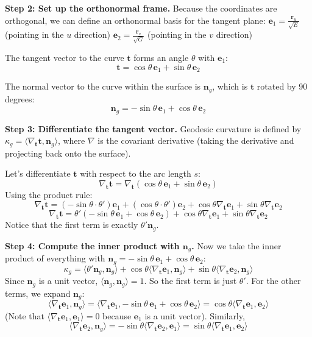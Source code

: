 \begin{solution}
\textbf{Step 2: Set up the orthonormal frame.}
Because the coordinates are orthogonal, we can define an orthonormal basis for the tangent plane:
$\mathbf{e}_1 = \frac{\mathbf{r}_u}{\sqrt{E}}$ (pointing in the $u$ direction)
$\mathbf{e}_2 = \frac{\mathbf{r}_v}{\sqrt{G}}$ (pointing in the $v$ direction)

The tangent vector to the curve $\mathbf{t}$ forms an angle $\theta$ with $\mathbf{e}_1$:
\[ \mathbf{t} = \cos\theta \, \mathbf{e}_1 + \sin\theta \, \mathbf{e}_2 \]

The normal vector to the curve within the surface is $\mathbf{n}_g$, which is $\mathbf{t}$ rotated by 90 degrees:
\[ \mathbf{n}_g = -\sin\theta \, \mathbf{e}_1 + \cos\theta \, \mathbf{e}_2 \]

\textbf{Step 3: Differentiate the tangent vector.}
Geodesic curvature is defined by $\kappa_g = \langle \nabla_\mathbf{t} \mathbf{t}, \mathbf{n}_g \rangle$, where $\nabla$ is the covariant derivative (taking the derivative and projecting back onto the surface).

Let's differentiate $\mathbf{t}$ with respect to the arc length $s$:
\[ \nabla_\mathbf{t} \mathbf{t} = \nabla_\mathbf{t} (\cos\theta \, \mathbf{e}_1 + \sin\theta \, \mathbf{e}_2) \]
Using the product rule:
\[ \nabla_\mathbf{t} \mathbf{t} = (-\sin\theta \cdot \theta')\mathbf{e}_1 + (\cos\theta \cdot \theta')\mathbf{e}_2 + \cos\theta \nabla_\mathbf{t} \mathbf{e}_1 + \sin\theta \nabla_\mathbf{t} \mathbf{e}_2 \]
\[ \nabla_\mathbf{t} \mathbf{t} = \theta'(-\sin\theta \, \mathbf{e}_1 + \cos\theta \, \mathbf{e}_2) + \cos\theta \nabla_\mathbf{t} \mathbf{e}_1 + \sin\theta \nabla_\mathbf{t} \mathbf{e}_2 \]
Notice that the first term is exactly $\theta' \mathbf{n}_g$.

\textbf{Step 4: Compute the inner product with $\mathbf{n}_g$.}
Now we take the inner product of everything with $\mathbf{n}_g = -\sin\theta \, \mathbf{e}_1 + \cos\theta \, \mathbf{e}_2$:
\[ \kappa_g = \langle \theta' \mathbf{n}_g, \mathbf{n}_g \rangle + \cos\theta \langle \nabla_\mathbf{t} \mathbf{e}_1, \mathbf{n}_g \rangle + \sin\theta \langle \nabla_\mathbf{t} \mathbf{e}_2, \mathbf{n}_g \rangle \]
Since $\mathbf{n}_g$ is a unit vector, $\langle \mathbf{n}_g, \mathbf{n}_g \rangle = 1$. So the first term is just $\theta'$.
For the other terms, we expand $\mathbf{n}_g$:
\[ \langle \nabla_\mathbf{t} \mathbf{e}_1, \mathbf{n}_g \rangle = \langle \nabla_\mathbf{t} \mathbf{e}_1, -\sin\theta \, \mathbf{e}_1 + \cos\theta \, \mathbf{e}_2 \rangle = \cos\theta \langle \nabla_\mathbf{t} \mathbf{e}_1, \mathbf{e}_2 \rangle \]
(Note that $\langle \nabla_\mathbf{t} \mathbf{e}_1, \mathbf{e}_1 \rangle = 0$ because $\mathbf{e}_1$ is a unit vector).
Similarly,
\[ \langle \nabla_\mathbf{t} \mathbf{e}_2, \mathbf{n}_g \rangle = -\sin\theta \langle \nabla_\mathbf{t} \mathbf{e}_2, \mathbf{e}_1 \rangle = \sin\theta \langle \nabla_\mathbf{t} \mathbf{e}_1, \mathbf{e}_2 \rangle \]


\end{solution}
